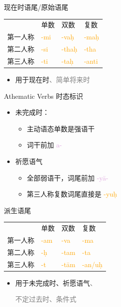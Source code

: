 \documentclass[17pt]{beamer}
\newcommand{\wordending}[1]{\textcolor{Orange}{\nobreakdash-#1}}
\newcommand{\pratyaya}[1]{\textcolor{Plum}{#1}}
\newcommand{\notsoimportant}[1]{\textcolor{gray}{#1}}
\begin{document}
\begin{frame}{现在时语尾/原始语尾}
  \centering
  \begin{tabular}{@{}llll@{}} %
    & 单数  & 双数  & 复数 \\
    第一人称 & \wordending{mi} & \wordending{vaḥ}  & \wordending{maḥ}  \\
    第二人称 & \wordending{si} & \wordending{thaḥ} & \wordending{tha}  \\
    第三人称 & \wordending{ti} & \wordending{taḥ} & \cellcolor{green!20}\wordending{anti} \\
  \end{tabular} 
  \bigskip
  \begin{itemize}
    \item 用于现在时\notsoimportant{、简单将来时}
  \end{itemize}  
\end{frame}

\begin{frame}{Athematic Verbs  时态标识}
  \raggedright
  \begin{itemize}
    \item 未完成时：
    \begin{itemize}
      \item 主动语态单数是强语干
      \item 词干前加 \pratyaya{a\nobreakdash-} 
    \end{itemize} 
    \bigskip

    \item 祈愿语气
    \begin{itemize}
      \item 全部弱语干，词尾前加 \pratyaya{\nobreakdash-yā-}
      \item 第三人称复数词尾直接是 \wordending{yuḥ}
    \end{itemize}
  \end{itemize}
\end{frame}


\begin{frame}{派生语尾}
  \centering
  \begin{tabular}{@{}llll@{}} %
    & 单数  & 双数  & 复数 \\
    第一人称 & \cellcolor{green!20}\wordending{am} & \wordending{va}  & \wordending{ma}  \\
    第二人称 & \cellcolor{yellow!30}\wordending{ḥ} & \wordending{tam} & \wordending{ta}  \\
    第三人称 & \cellcolor{yellow!30}\wordending{t} & \wordending{tām} & \cellcolor{green!20}\wordending{an/uḥ}  \\
  \end{tabular}  
  \bigskip
  \begin{itemize}
    \item 用于未完成时、祈愿语气\notsoimportant{、}
    
    \notsoimportant{不定过去时、条件式}
  \end{itemize}
\end{frame}
\end{document}
